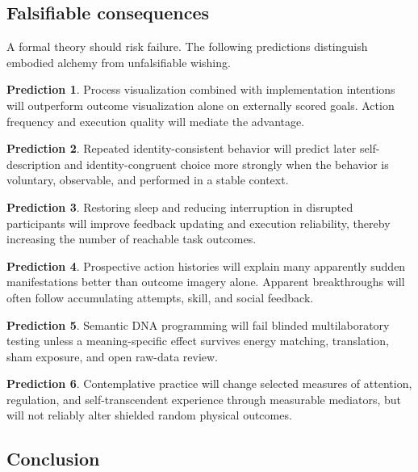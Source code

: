 \documentclass[11pt]{article}
\theoremstyle{plain}
\theoremstyle{definition}
\newtheorem{prediction}{Prediction}
\begin{document}
\subsection*{Falsifiable consequences}

A formal theory should risk failure. The following predictions distinguish embodied
alchemy from unfalsifiable wishing.

\begin{prediction}
Process visualization combined with implementation intentions will outperform outcome
visualization alone on externally scored goals. Action frequency and execution quality
will mediate the advantage.
\end{prediction}

\begin{prediction}
Repeated identity-consistent behavior will predict later self-description and
identity-congruent choice more strongly when the behavior is voluntary, observable,
and performed in a stable context.
\end{prediction}

\begin{prediction}
Restoring sleep and reducing interruption in disrupted participants will improve
feedback updating and execution reliability, thereby increasing the number of
reachable task outcomes.
\end{prediction}

\begin{prediction}
Prospective action histories will explain many apparently sudden manifestations better
than outcome imagery alone. Apparent breakthroughs will often follow accumulating
attempts, skill, and social feedback.
\end{prediction}

\begin{prediction}
Semantic DNA programming will fail blinded multilaboratory testing unless a
meaning-specific effect survives energy matching, translation, sham exposure, and open
raw-data review.
\end{prediction}

\begin{prediction}
Contemplative practice will change selected measures of attention, regulation, and
self-transcendent experience through measurable mediators, but will not reliably alter
shielded random physical outcomes.
\end{prediction}

\subsection*{Conclusion}
\end{document}
